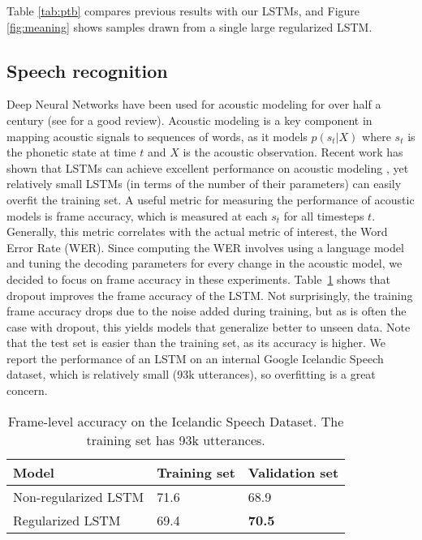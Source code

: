 \documentclass{article}
\begin{document}
Table \ref{tab:ptb} compares previous results with our LSTMs, and
Figure \ref{fig:meaning} shows samples drawn from a single large 
regularized LSTM.


\subsection{Speech recognition}
\label{sec:speech}

Deep Neural Networks have been used for acoustic modeling for over half a century (see
\citet{BourlardASR} for a good review). Acoustic modeling is a key
component in mapping acoustic signals to sequences of words, as it
models $p(s_t|X)$ where $s_t$ is the phonetic state at time $t$ and $X$
is the acoustic observation. Recent work has shown that LSTMs can 
achieve excellent performance on acoustic modeling \cite{sak2014speech}, yet
relatively small LSTMs (in terms of the number of their parameters) can
easily overfit the training set. A useful metric for measuring the performance of acoustic models is frame
accuracy, which is measured at each $s_t$ for all timesteps
$t$. Generally, this metric correlates with the actual metric of
interest, the Word Error Rate (WER). Since computing the WER
involves using a language model and tuning the decoding parameters for
every change in the acoustic model, we decided to focus on frame
accuracy in these experiments. Table~\ref{tab:speech} shows
that dropout improves the frame accuracy of the LSTM. Not
surprisingly, the training frame accuracy drops due to the noise added
during training, but as is often the case with dropout, this yields
models that generalize better to unseen data. Note that the test
set is easier than the training set, as its accuracy is higher.  We
report the performance of an LSTM on an internal Google Icelandic
Speech dataset, which is relatively small (93k utterances), so
overfitting is a great concern.

\begin{table}[t]
  \small
  \centering
  \renewcommand{\arraystretch}{1.15}
  \begin{tabular}{lll}
    \hline
     Model & Training set & Validation set \\
    \hline
    Non-regularized LSTM & 71.6 & 68.9 \\
    Regularized LSTM & 69.4 & {\bf 70.5} \\
    \hline
  \end{tabular}
  \caption{Frame-level accuracy on the Icelandic Speech Dataset. The training set has 93k utterances.}
  \label{tab:speech}
\end{table}
\end{document}
